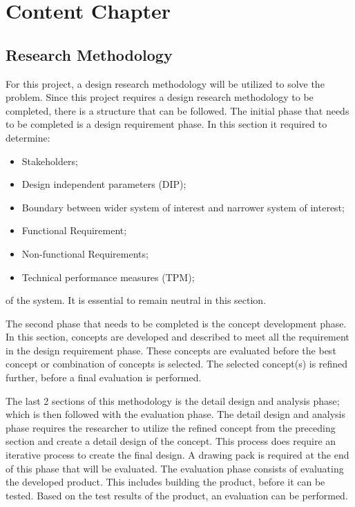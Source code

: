 \chapter{Content Chapter}
\label{sec:Content Chapter}


\section{Research Methodology}
\label{sec:Research Methodology}

 For this project, a design research methodology will be utilized to solve the problem. Since this project requires a design research methodology to be completed, there is a structure that can be followed. The initial phase that needs to be completed is a design requirement phase. In this section it required to determine:

\begin{itemize}
    \item Stakeholders;
    \item Design independent parameters (DIP);
    \item Boundary between wider system of interest and narrower system of interest;
    \item Functional Requirement;
    \item Non-functional Requirements;
    \item Technical performance measures (TPM);
\end{itemize}

of the system. It is essential to remain neutral in this section.


The second phase that needs to be completed is the concept development phase. In this section, concepts are developed and described to meet all the requirement in the design requirement phase. These concepts are evaluated before the best concept or combination of concepts is selected. The selected concept(s) is refined further, before a final evaluation is performed.


The last 2 sections of this methodology is the detail design and analysis phase; which is then followed with the evaluation phase. The detail design and analysis phase requires the researcher to utilize the refined concept from the preceding section and create a detail design of the concept. This process does require an iterative process to create the final design. A drawing pack is required at the end of this phase that will be evaluated. The evaluation phase consists of evaluating the developed product. This includes building the product, before it can be tested. Based on the test results of the product, an evaluation can be performed.


